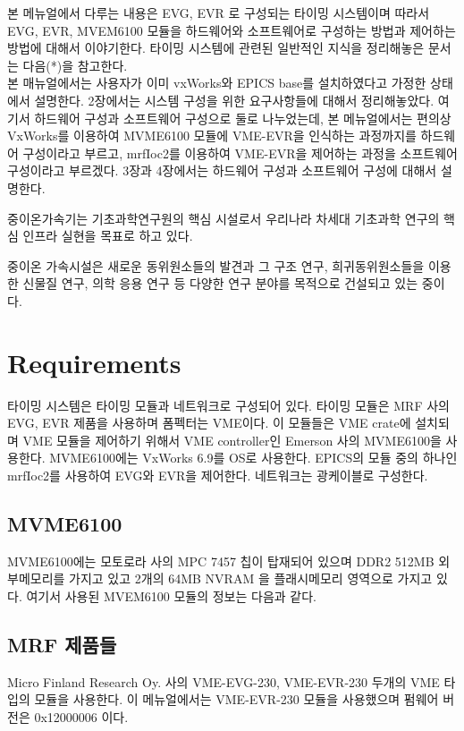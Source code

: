 \documentclass[11pt,a4paper]{article}
\begin{document}
본 메뉴얼에서 다루는 내용은 EVG, EVR 로 구성되는 타이밍 시스템이며 따라서
EVG, EVR, MVEM6100 모듈을 하드웨어와 소프트웨어로 구성하는 방법과 제어하는 방법에 대해서 이야기한다.
타이밍 시스템에 관련된 일반적인 지식을 정리해놓은 문서는 다음(*)을 참고한다.
\\

본 매뉴얼에서는 사용자가 이미 vxWorks와 EPICS base를 설치하였다고 가정한 상태에서 설명한다.
2장에서는 시스템 구성을 위한 요구사항들에 대해서 정리해놓았다.
여기서 하드웨어 구성과 소프트웨어 구성으로 둘로 나누었는데,
본 메뉴얼에서는 편의상 VxWorks를 이용하여 MVME6100 모듈에 VME-EVR을 인식하는 과정까지를 하드웨어 구성이라고 부르고,
mrfIoc2를 이용하여 VME-EVR을 제어하는 과정을 소프트웨어 구성이라고 부르겠다.
3장과 4장에서는 하드웨어 구성과 소프트웨어 구성에 대해서 설명한다.

중이온가속기는 기초과학연구원의 핵심 시설로서 우리나라 차세대 기초과학 연구의 핵심 인프라 실현을 목표로 하고 있다.


중이온 가속시설은 새로운 동위원소들의 발견과
 그 구조 연구, 희귀동위원소들을 이용한 신물질 연구, 의학 응용 연구 등 다양한 연구 분야를 목적으로 건설되고 있는 중이다.

\section{Requirements}
\vspace{0.5em}
타이밍 시스템은 타이밍 모듈과 네트워크로 구성되어 있다.
타이밍 모듈은 MRF 사의 EVG, EVR 제품을 사용하며 폼펙터는 VME이다.
이 모듈들은 VME crate에 설치되며 VME 모듈을 제어하기 위해서 VME controller인 
Emerson 사의 MVME6100을 사용한다.
MVME6100에는 VxWorks 6.9를 OS로 사용한다.
EPICS의 모듈 중의 하나인 mrfIoc2를 사용하여 EVG와 EVR을 제어한다.
네트워크는 광케이블로 구성한다. 

\subsection{MVME6100}
MVME6100에는 모토로라 사의 MPC 7457 칩이 탑재되어 있으며 DDR2 512MB 외부메모리를 가지고 있고
2개의 64MB NVRAM 을 플래시메모리 영역으로 가지고 있다. 여기서 사용된  MVEM6100 모듈의 정보는 다음과 같다.

\subsection{MRF 제품들}
Micro Finland Research Oy. 사의 VME-EVG-230, VME-EVR-230 두개의 VME 타입의 모듈을 사용한다.
이 메뉴얼에서는 VME-EVR-230 모듈을 사용했으며 펌웨어 버전은 0x12000006 이다.
\end{document}
